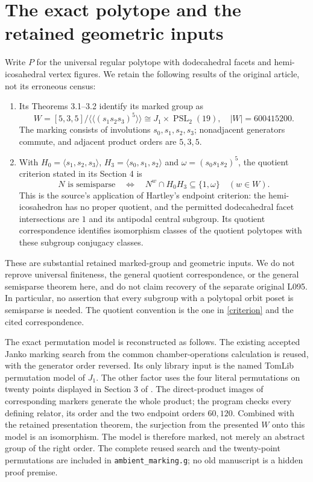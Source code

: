 \documentclass[11pt,a4paper]{article}
\begin{document}
\section{The exact polytope and the retained geometric inputs}
Write $P$ for the universal regular polytope with dodecahedral facets and hemi-icosahedral vertex figures. We retain the following results of the original article, not its erroneous census:
\begin{enumerate}
\item Its Theorems 3.1--3.2 identify its marked group as
\[
 W=[5,3,5]/\langle\!\langle(s_1s_2s_3)^5\rangle\!\rangle
   \cong J_1\times\operatorname{PSL}_2(19),\quad |W|=600415200.
\]
The marking consists of involutions $s_0,s_1,s_2,s_3$; nonadjacent generators commute, and adjacent product orders are $5,3,5$.
\item With $H_0=\langle s_1,s_2,s_3\rangle$, $H_3=\langle s_0,s_1,s_2\rangle$ and $\omega=(s_0s_1s_2)^5$, the quotient criterion stated in its Section 4 is
\begin{equation}\label{criterion}
 N\text{ is semisparse}\quad\Longleftrightarrow\quad
 N^w\cap H_0H_3\subseteq\{1,\omega\}\quad(w\in W).
\end{equation}
This is the source's application of Hartley's endpoint criterion: the hemi-icosahedron has no proper quotient, and the permitted dodecahedral facet intersections are $1$ and its antipodal central subgroup. Its quotient correspondence identifies isomorphism classes of the quotient polytopes with these subgroup conjugacy classes.
\end{enumerate}
These are substantial retained marked-group and geometric inputs. We do not reprove universal finiteness, the general quotient correspondence, or the general semisparse theorem here, and do not claim recovery of the separate original L095. In particular, no assertion that every subgroup with a polytopal orbit poset is semisparse is needed. The quotient convention is the one in \eqref{criterion} and the cited correspondence.

The exact permutation model is reconstructed as follows. The existing accepted Janko marking search from the common chamber-operations calculation is reused, with the generator order reversed. Its only library input is the named TomLib permutation model of $J_1$. The other factor uses the four literal permutations on twenty points displayed in Section 3 of \cite{original}. The direct-product images of corresponding markers generate the whole product; the program checks every defining relator, its order and the two endpoint orders $60,120$. Combined with the retained presentation theorem, the surjection from the presented $W$ onto this model is an isomorphism. The model is therefore marked, not merely an abstract group of the right order. The complete reused search and the twenty-point permutations are included in \texttt{ambient\_marking.g}; no old manuscript is a hidden proof premise.
\end{document}
